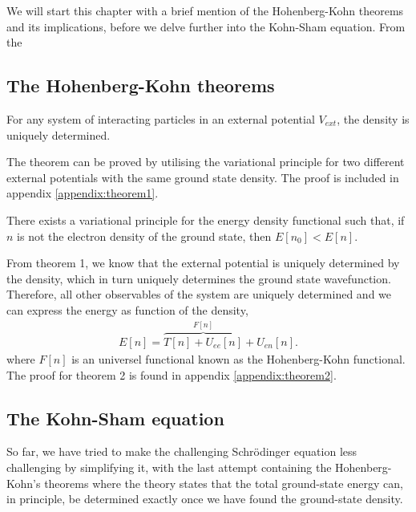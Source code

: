 We will start this chapter with a brief mention of the Hohenberg-Kohn theorems and its implications, before we delve further into the Kohn-Sham equation. From the

\subsection{The Hohenberg-Kohn theorems}

\begin{theorem}
  For any system of interacting particles in an external potential $V_{ext}$, the density is uniquely determined.
\end{theorem}

The theorem can be proved by utilising the variational principle for two different external potentials with the same ground state density.
The proof is included in appendix \ref{appendix:theorem1}.

\begin{theorem}
  There exists a variational principle for the energy density functional such that, if $n$ is not the electron density of the ground state, then $E\left[ n_0 \right] < E\left[ n \right]$.
\end{theorem}

From theorem 1, we know that the external potential is uniquely determined by the density, which in turn uniquely determines the ground state wavefunction. Therefore, all other observables of the system are uniquely determined and we can express the energy as function of the density,
\begin{align}
  E[n] = \overbrace{T[n] + U_{ee}[n]}^{F[n]} + U_{en}[n].
  \label{eq:densityfunctional}
\end{align}
where $F[n]$ is an universel functional known as the Hohenberg-Kohn functional. The proof for theorem 2 is found in appendix \ref{appendix:theorem2}.

\subsection{The Kohn-Sham equation}
So far, we have tried to make the challenging Schrödinger equation less challenging by simplifying it, with the last attempt containing the Hohenberg-Kohn's theorems where the theory states that the total ground-state energy can, in principle, be determined exactly once we have found the ground-state density.

